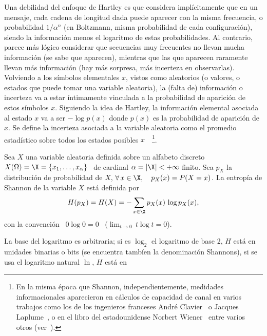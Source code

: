 Una debilidad del enfoque de Hartley es que considera impl\'icitamente que en un
mensaje, cada cadena de longitud dada  puede aparecer con la misma frecuencia, o
probabilidad   $1/\alpha^n$   (en   Boltzmann,   misma  probabilidad   de   cada
configuraci\'on),  siendo   la  informaci\'on   menos  el  logaritmo   de  estas
probabilidades.  Al  contrario, parece m\'as l\'ogico  considerar que secuencias
muy frecuentes  no llevan mucha  informaci\'on (se sabe que  aparecen), mientras
que las que  aparecen raramente llevan m\'as informaci\'on  (hay m\'as sorpresa,
m\'as incerteza  en observarlas).  Volviendo  a los s\'imbolos  elementales $x$,
vistos  como aleatorios  (o  valores, o  estados  que puede  tomar una  variable
aleatoria), la  (falta de)  informaci\'on o incerteza  va a  estar \'intimamente
vinculada a la probabilidad de aparici\'on de estos s\'imbolos $x$. Siguiendo la
idea de Hartley,  la informaci\'on elemental asociada al estado $x$  va a ser $-
\log p(x)$ donde $p(x)$ es la  probabilidad de aparici\'on de $x$.  Se define la
incerteza asociada a la variable  aleatoria como el promedio estad\'istico sobre
todos  los  estados posibles  $x$~\cite{Sha48,  ShaWea64}~\footnote{En la  misma
  \'epoca que Shannon, independientemente, medidades informacionales aparecieron
  en  c\'alculos de  capacidad  de canal  en  varios trabajos  como  los de  los
  ingenieros     franceses     Andr\'e     Clavier~\cite{Cla48}    o     Jacques
  Laplume~\cite{Lap48},   o    en   el   libro    del   estadounidense   Norbert
  Wiener~\cite[Cap.~III]{Wie48}  entre  varios  otros (ver~\cite[y  Ref.]{Ver98,
    Lun02, RioMag14, FlaRio16, RioFla17, Che17}).}.
%
\begin{definicion}\label{Def:SZ:Shannon}
  Sea  $X$  una  variable  aleatoria  definida  sobre  un  alfabeto  discreto  \
  $X(\Omega) = \X = \{ x_1 , \ldots  , x_\alpha \}$ \ de cardinal $\alpha = |\X|
  < + \infty$ finito. Sea $p_X$  la distribuci\'on de probabilidad de $X$, \ie $
  \forall \, x \in \X, \quad p_X(x) = P(X = x)$.  La entrop\'ia de Shannon de la
  variable $X$ est\'a definida por
  \[
    H(p_X) = H(X) = - \sum_{x \in \X} p_X(x) \, \log p_X(x),
  \]
  con la  convenci\'on \ $0 \log  0 = 0$ \  ($\displaystyle \lim_{t \to  0} \, t
  \log t = 0$).
\end{definicion}
%
\noindent La  base del logaritmo es  arbitraria; si es $\log_2$  el logaritmo de
base  2, $H$  est\'a en  unidades  binarias o  bits (se  encuentra tamb\'ien  la
denominaci\'on Shannons),  si se usa el  logaritmo natural $\ln$,  $H$ est\'a en
